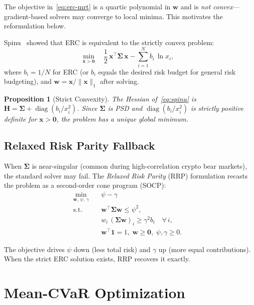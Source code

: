 \documentclass[12pt,a4paper]{article}
\newtheorem{proposition}{Proposition}[section]
\newcommand{\diag}{\operatorname{diag}}
\begin{document}
The objective in~\eqref{eq:erc-mrt} is a quartic polynomial in $\bm{w}$ and is \emph{not convex}---gradient-based solvers may converge to local minima. This motivates the reformulation below.

Spinu~\cite{spinu2013} showed that ERC is equivalent to the strictly convex problem:
\begin{equation}
\boxed{
    \min_{\bm{x} > \bm{0}} \quad \frac{1}{2}\,\bm{x}^\top\bm{\Sigma}\,\bm{x}
        - \sum_{i=1}^{N} b_i\,\ln x_i,
}
\label{eq:spinu}
\end{equation}
where $b_i = 1/N$ for ERC (or $b_i$ equals the desired risk budget for general risk budgeting), and $\bm{w} = \bm{x}/\|\bm{x}\|_1$ after solving.

\begin{proposition}[Strict Convexity]
The Hessian of~\eqref{eq:spinu} is $\bm{H} = \bm{\Sigma} + \diag(b_i/x_i^2)$. Since $\bm{\Sigma}$ is PSD and $\diag(b_i/x_i^2)$ is strictly positive definite for $\bm{x} > \bm{0}$, the problem has a unique global minimum.
\end{proposition}

\subsection{Relaxed Risk Parity Fallback}

When $\bm{\Sigma}$ is near-singular (common during high-correlation crypto bear markets), the standard solver may fail. The \emph{Relaxed Risk Parity} (RRP) formulation recasts the problem as a second-order cone program (SOCP):
\begin{equation}
\begin{aligned}
    \min_{\bm{w},\,\psi,\,\gamma} \quad & \psi - \gamma \\
    \text{s.t.} \quad & \bm{w}^\top\bm{\Sigma}\bm{w} \leq \psi^2, \\
    & w_i\,(\bm{\Sigma w})_i \geq \gamma^2 b_i \quad \forall\, i, \\
    & \bm{w}^\top\bm{1} = 1,\; \bm{w} \geq \bm{0},\; \psi, \gamma \geq 0.
\end{aligned}
\label{eq:rrp}
\end{equation}

The objective drives $\psi$ down (less total risk) and $\gamma$ up (more equal contributions). When the strict ERC solution exists, RRP recovers it exactly.

\section{Mean-CVaR Optimization}
\label{sec:cvar}
\end{document}
